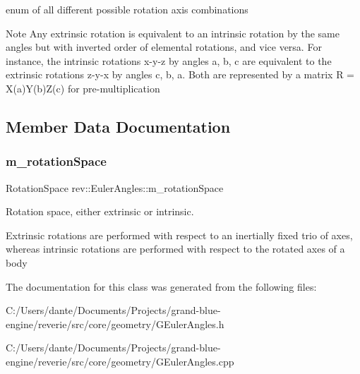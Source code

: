 enum of all different possible rotation axis combinations 

\begin{DoxyNote}{Note}
Any extrinsic rotation is equivalent to an intrinsic rotation by the same angles but with inverted order of elemental rotations, and vice versa. For instance, the intrinsic rotations x-\/y\textquotesingle{}-\/z\textquotesingle{}\textquotesingle{} by angles a, b, c are equivalent to the extrinsic rotations z-\/y-\/x by angles c, b, a. Both are represented by a matrix R = X(a)Y(b)Z(c) for pre-\/multiplication 
\end{DoxyNote}


\subsection{Member Data Documentation}
\mbox{\label{classrev_1_1_euler_angles_abeac6934af203889a200b47b2c16050e}} 
\subsubsection{\texorpdfstring{m\_rotationSpace}{m\_rotationSpace}}
{\footnotesize\ttfamily Rotation\+Space rev\+::\+Euler\+Angles\+::m\+\_\+rotation\+Space\hspace{0.3cm}{\ttfamily [protected]}}



Rotation space, either extrinsic or intrinsic. 

Extrinsic rotations are performed with respect to an inertially fixed trio of axes, whereas intrinsic rotations are performed with respect to the rotated axes of a body 

The documentation for this class was generated from the following files\+:\begin{DoxyCompactItemize}
\item 
C\+:/\+Users/dante/\+Documents/\+Projects/grand-\/blue-\/engine/reverie/src/core/geometry/G\+Euler\+Angles.\+h\item 
C\+:/\+Users/dante/\+Documents/\+Projects/grand-\/blue-\/engine/reverie/src/core/geometry/G\+Euler\+Angles.\+cpp\end{DoxyCompactItemize}
